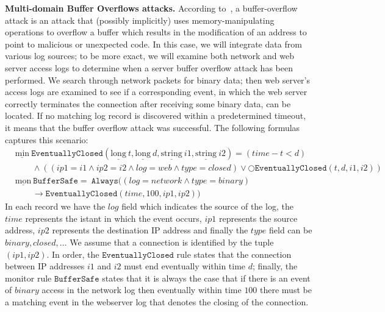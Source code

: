 \documentclass[english]{article}
\begin{document}
\textbf{Multi-domain Buffer Overflows attacks.}
According to~\cite{piromsopa2006buffer}, a buffer-overflow attack is an attack that (possibly implicitly) uses memory-manipulating operations to overflow a buffer which results in the modification of an address to point to malicious or unexpected code. In this case, we will integrate data from various log sources; to be more exact, we will examine both network and web server access logs to determine when a server buffer overflow attack has been performed. We search through network packets for binary data; then web server's access logs are examined to see if a corresponding event, in which the web server correctly terminates the connection after receiving some binary data, can be located. If no matching log record is discovered within a predetermined timeout, it means that the buffer overflow attack was successful. The following formulas captures this scenario:
\begin{align*}
    & \underline{\text{min}}\ \mathtt{EventuallyClosed}(\underline{\text{long}}\ t,\underline{\text{long}}\ d,\underline{\text{string}}\ i1,\underline{\text{string}}\ i2) = (time-t<d)\\
    & \quad\quad\land ((ip1=i1\land ip2=i2\land log=web\land type=closed)\lor \bigcirc\mathtt{EventuallyClosed}(t,d,i1,i2) ) \\
    & \underline{\text{mon}}\ \mathtt{BufferSafe} =\ \mathtt{Always}((log=network\land type=binary) \\
    & \quad\quad\rightarrow\mathtt{EventuallyClosed}(time,100,ip1,ip2))
\end{align*}
In each record we have the $log$ field which indicates the source of the log, the $time$ represents the istant in which the event occurs, $ip1$ represents the source address, $ip2$ represents the destination IP address and finally the $type$ field can be $binary, closed,\ldots$ We assume that a connection is identified by the tuple $(ip1,ip2)$. In order, the $\mathtt{EventuallyClosed}$ rule states that the connection between IP addresses $i1$ and $i2$ must end eventually within time $d$; finally, the monitor rule $\mathtt{BufferSafe}$ states that it is always the case that if there is an event of $binary$ access in the network log then eventually within time $100$ there must be a matching event in the webserver log that denotes the closing of the connection. 
\end{document}

